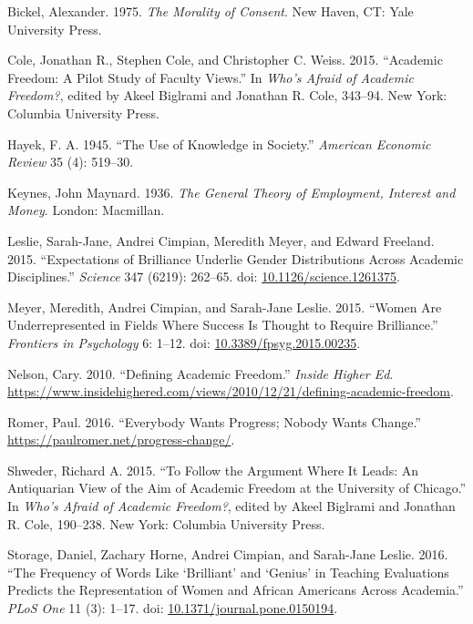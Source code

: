 \documentclass[
  11pt,
  letterpaper,
  DIV=11,
  numbers=noendperiod,
  twoside]{scrartcl}
\newlength{\cslhangindent}
\newenvironment{CSLReferences}[2] %
 {\begin{list}{}{%
  \setlength{\itemindent}{0pt}
  \setlength{\leftmargin}{0pt}
  \setlength{\parsep}{0pt}
  \ifodd #1
   \setlength{\leftmargin}{\cslhangindent}
   \setlength{\itemindent}{-1\cslhangindent}
  \fi
  \setlength{\itemsep}{#2\baselineskip}}}
 {\end{list}}
\begin{document}
\protect{}\label{refs}
\begin{CSLReferences}{1}{0}
Bickel, Alexander. 1975. \emph{The Morality of Consent}. New Haven, CT:
Yale University Press.

Cole, Jonathan R., Stephen Cole, and Christopher C. Weiss. 2015.
{``Academic Freedom: A Pilot Study of Faculty Views.''} In \emph{Who's
Afraid of Academic Freedom?}, edited by Akeel Biglrami and Jonathan R.
Cole, 343--94. New York: Columbia University Press.

Hayek, F. A. 1945. {``The Use of Knowledge in Society.''} \emph{American
Economic Review} 35 (4): 519--30.

Keynes, John Maynard. 1936. \emph{The General Theory of Employment,
Interest and Money}. London: Macmillan.

Leslie, Sarah-Jane, Andrei Cimpian, Meredith Meyer, and Edward Freeland.
2015. {``Expectations of Brilliance Underlie Gender Distributions Across
Academic Disciplines.''} \emph{Science} 347 (6219): 262--65. doi:
\href{https://doi.org/10.1126/science.1261375}{10.1126/science.1261375}.

Meyer, Meredith, Andrei Cimpian, and Sarah-Jane Leslie. 2015. {``Women
Are Underrepresented in Fields Where Success Is Thought to Require
Brilliance.''} \emph{Frontiers in Psychology} 6: 1--12. doi:
\href{https://doi.org/10.3389/fpsyg.2015.00235}{10.3389/fpsyg.2015.00235}.

Nelson, Cary. 2010. {``Defining Academic Freedom.''} \emph{Inside Higher
Ed}.
\url{https://www.insidehighered.com/views/2010/12/21/defining-academic-freedom}.

Romer, Paul. 2016. {``Everybody Wants Progress; Nobody Wants Change.''}
\url{https://paulromer.net/progress-change/}.

Shweder, Richard A. 2015. {``To Follow the Argument Where It Leads: An
Antiquarian View of the Aim of Academic Freedom at the University of
Chicago.''} In \emph{Who's Afraid of Academic Freedom?}, edited by Akeel
Biglrami and Jonathan R. Cole, 190--238. New York: Columbia University
Press.

Storage, Daniel, Zachary Horne, Andrei Cimpian, and Sarah-Jane Leslie.
2016. {``The Frequency of Words Like {`Brilliant'} and {`Genius'} in
Teaching Evaluations Predicts the Representation of Women and African
Americans Across Academia.''} \emph{PLoS One} 11 (3): 1--17. doi:
\href{https://doi.org/10.1371/journal.pone.0150194}{10.1371/journal.pone.0150194}.


\end{CSLReferences}
\end{document}
